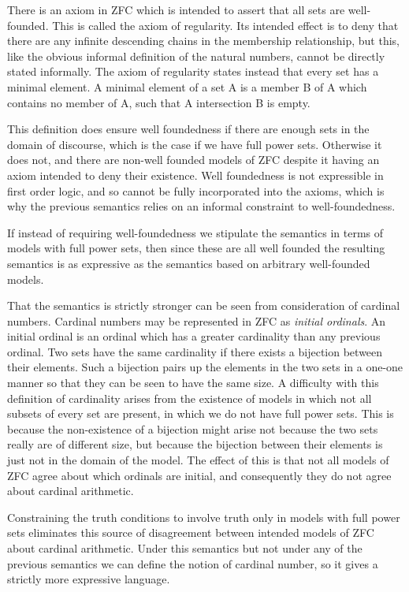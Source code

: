 There is an axiom in ZFC which is intended to assert that all sets are
well-founded.
This is called the axiom of regularity.
Its intended effect is to deny that there are any infinite descending
chains in the membership relationship, but this, like the obvious informal
definition of the natural numbers, cannot be directly stated
informally.
The axiom of regularity states instead that every set has a minimal
element.
A minimal element of a set A is a member B of A which contains no member of
A, such that A intersection B is empty.

This definition does ensure well foundedness if there are enough sets
in the domain of discourse, which is the case if we have full power
sets.
Otherwise it does not, and there are non-well founded models of ZFC
despite it having an axiom intended to deny their existence.
Well foundedness is not expressible in first order logic, and so
cannot be fully incorporated into the axioms, which is why the
previous semantics relies on an informal constraint to
well-foundedness.

If instead of requiring well-foundedness we stipulate the semantics in
terms of models with full power sets, then since these are all well
founded the resulting semantics is as expressive as the semantics
based on arbitrary well-founded models.

That the semantics is strictly stronger can be seen from consideration
of cardinal numbers.
Cardinal numbers may be represented in ZFC as \emph{initial ordinals}.
An initial ordinal is an ordinal which has a greater cardinality than
any previous ordinal.
Two sets have the same cardinality if there exists a bijection between
their elements.
Such a bijection pairs up the elements in the two sets in a one-one
manner so that they can be seen to have the same size.
A difficulty with this definition of cardinality arises from the
existence of models in which not all subsets of every set are
present, in which we do not have full power sets.
This is because the non-existence of a bijection might arise not
because the two sets really are of different size, but because the
bijection between their elements is just not in the domain of the
model.
The effect of this is that not all models of ZFC agree about which
ordinals are initial, and consequently they do not agree about
cardinal arithmetic.

Constraining the truth conditions to involve truth only in models with
full power sets eliminates this source of disagreement between
intended models of ZFC about cardinal arithmetic.
Under this semantics but not under any of the previous semantics we
can define the notion of cardinal number, so it gives a strictly more
expressive language.

